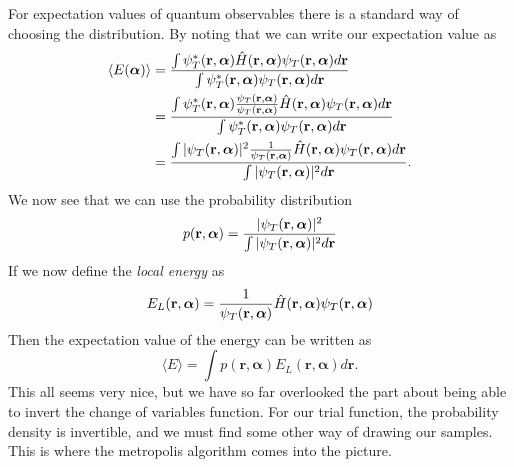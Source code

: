 \documentclass[aps,prc,twocolumn,floatfix]{revtex4}
\def\rvec{\textbf{r}}
\def\alphavec{\boldsymbol\alpha}
\begin{document}
For expectation values of quantum observables there is a standard way of choosing the distribution. By noting that we can write our expectation value as 
\begin{align}
 \langle E(\alphavec) \rangle & = \frac{\int \psi^{\ast}_T(\rvec, \alphavec)\hat{H}(\rvec, \alphavec)\psi_T(\rvec, \alphavec) d\rvec} {\int\psi^{\ast}_T(\rvec, \alphavec)\psi_T(\rvec, \alphavec) d\rvec} \\
 & = \frac{\int \psi^{\ast}_T(\rvec, \alphavec){ \psi_T(\rvec, \alphavec) \over \psi_T(\rvec, \alphavec) }\hat{H}(\rvec, \alphavec)\psi_T(\rvec, \alphavec) d\rvec} {\int\psi^{\ast}_T(\rvec, \alphavec)\psi_T(\rvec, \alphavec) d\rvec} \\
 & = \frac{\int |\psi_T(\rvec, \alphavec)|^2{ 1 \over \psi_T(\rvec, \alphavec) }\hat{H}(\rvec, \alphavec)\psi_T(\rvec, \alphavec) d\rvec} {\int|\psi_T(\rvec, \alphavec)|^2 d\rvec}.
\end{align}
We now see that we can use the probability distribution 
\begin{align}
 p(\rvec, \alphavec) = { |\psi_T(\rvec, \alphavec)|^2 \over \int|\psi_T(\rvec, \alphavec)|^2 d\rvec }
\end{align}
If we now define the {\it local energy} as 
\begin{equation}
 E_L(\rvec, \alphavec) = {1 \over \psi_T(\rvec, \alphavec) }\hat{H}(\rvec, \alphavec)\psi_T(\rvec, \alphavec) 
\end{equation}
Then the expectation value of the energy can be written as
\begin{equation}
 \langle E \rangle = \int p(\rvec, \alphavec)E_L(\rvec, \alphavec) d\rvec.
\end{equation}
This all seems very nice, but we have so far overlooked the part about being able to invert the change of variables function. For our trial function, the probability density is invertible, and we must find some other way of drawing our samples. This is where the metropolis algorithm comes into the picture. 
\end{document}
